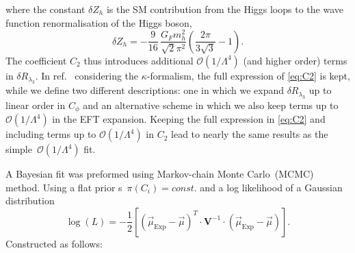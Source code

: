 	where the constant $\delta Z_h$ is the SM contribution from the Higgs loops to the wave function renormalisation of the Higgs boson,
	\begin{equation}
		\delta Z_h =-\frac{9}{16}\,\frac{G_F m_h^2}{\sqrt{2}\pi^2}\left(\frac{2\pi}{3\sqrt{3}}-1\right).
	\end{equation}
	The coefficient $C_2$ thus introduces additional $\mathcal{O}(1/\Lambda^4)$ (and higher order) terms in $\delta R_{\lambda_3}$.  
	In ref.~\cite{Degrassi:2016wml} considering the $\kappa$-formalism, the full expression of \eqref{eq:C2} is kept, while we define two different descriptions: one in which we expand $\delta R_{\lambda_3}$ up to linear order in $C_\phi$ and an alternative scheme in which we also keep terms up to $\mathcal{O}(1/\Lambda^4)$ in the EFT expansion. Keeping the full expression in \eqref{eq:C2} and including terms up to $\mathcal{O}(1/\Lambda^4)$  in $C_2$ lead to nearly the same results as the simple~$\mathcal{O}(1/\Lambda^4)$ fit.
	
	A Bayesian fit was preformed using Markov-chain Monte Carlo~(MCMC) method.   Using a flat prior s~$ \pi(C_i)= const.$ and a log likelihood of a Gaussian distribution 
	\begin{equation}
		\log(L) = -\frac{1}{2}\left[  (\vec{\mu}_{\mathrm{Exp}} -\vec{\mu} ) ^{T} \cdot \mathbf{V}^{-1} \cdot ( \vec{\mu}_{\mathrm{Exp}} -\vec{\mu} )\right]  .
		\label{eq:loglike}
	\end{equation}
	Constructed as follows:
